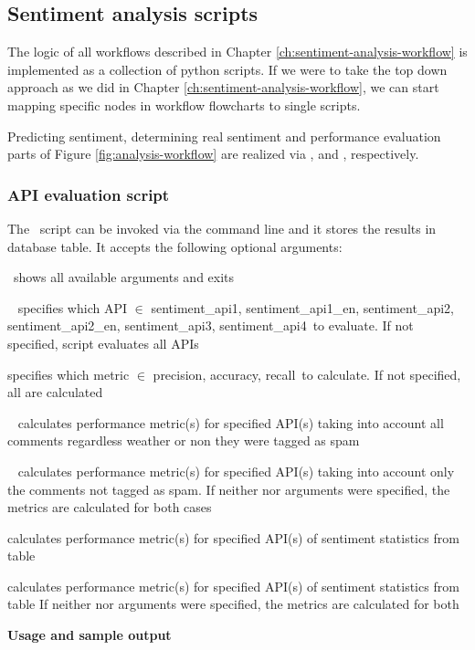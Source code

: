 \subsection{Sentiment analysis scripts\label{sec:sentiment-analysis-workflow}}

The logic of all workflows described in Chapter \ref{ch:sentiment-analysis-workflow} is implemented as a collection of python scripts.
If we were to take the top down approach as we did in Chapter \ref{ch:sentiment-analysis-workflow}, we can start mapping specific nodes in workflow flowcharts to single scripts.

Predicting sentiment, determining real sentiment and performance evaluation parts of Figure \ref{fig:analysis-workflow} are realized via 
\emph{}, 
\emph{} and 
\emph{}, respectively.

\subsubsection*{API evaluation script}
\noindent The \emph{}\ script can be invoked via the command line and it stores the results in  database table. It accepts the following optional arguments:

\begin{description}[labelindent=0.7cm, leftmargin=1.7cm]
\singlespacing
\item[--help -h ] shows all available arguments and exits
\item[--api \textless name\textgreater] 
	specifies which API $\in$ \lcb 
	sentiment\_api1, 
	sentiment\_api1\_en, 
	sentiment\_api2, 
	sentiment\_api2\_en, 
	sentiment\_api3, 
	sentiment\_api4\rcb\ to evaluate. If not specified, script evaluates all APIs 
\item[--metric \textless name\textgreater ]
	specifies which metric $\in$ \lcb
	precision, accuracy, recall\rcb\ to calculate. If not specified, all are calculated
\item[--spam] 
	calculates performance metric(s) for specified API(s) taking into account all comments regardless weather or non they were tagged as spam
\item[--no-spam] 
	calculates performance metric(s) for specified API(s) taking into account only the comments not tagged as spam. 
	If neither  nor  arguments were specified, the metrics are calculated for both cases
\item[--emoji] 
	calculates performance metric(s) for specified API(s) of sentiment statistics from  table
\item[--no-emoji] 
	calculates performance metric(s) for specified API(s) of sentiment statistics from  table
	If neither  nor  arguments were specified, the metrics are calculated for both
\end{description}
\textbf{Usage and sample output}


